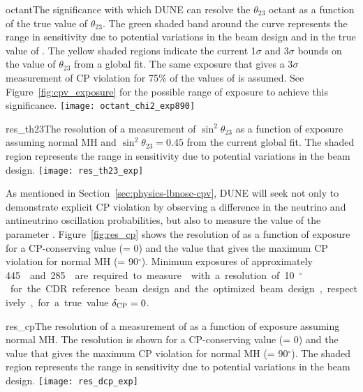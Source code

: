 \begin{cdrfigure}{octant}{The significance with which DUNE can resolve the $\theta_{23}$ octant as a function of the true value of $\theta_{23}$. The green shaded band around the curve represents the range in sensitivity due to potential variations in the beam design and in the true value of \deltacp. The yellow shaded regions indicate the current 1$\sigma$ and 3$\sigma$ bounds on the value of $\theta_{23}$ from a global fit.  The same exposure that gives a 3$\sigma$ measurement of CP violation for 75\% of the values of \deltacp is assumed.  See Figure~\ref{fig:cpv_exposure} for the possible range of exposure to achieve this significance.}
 \texttt{[image: octant\_chi2\_exp890]}
\end{cdrfigure}

\begin{cdrfigure}{res_th23}{The resolution of a measurement of $\sin^2\theta_{23}$ as a function of exposure assuming normal MH and $\sin^2\theta_{23} = 0.45$ from the current global fit. The shaded region represents the range in sensitivity due to potential variations in the beam design.  }
 \texttt{[image: res\_th23\_exp]}
\end{cdrfigure}


As mentioned in Section~\ref{sec:physics-lbnosc-cpv}, DUNE will seek not only to demonstrate explicit CP violation by observing a difference in the neutrino and antineutrino oscillation probabilities, but also to measure the value of the parameter \deltacp.  Figure~\ref{fig:res_cp} shows the resolution of \deltacp as a function of exposure for a CP-conserving value (\deltacp = 0) and the value that gives the maximum CP violation for normal MH (\deltacp = 90\mbox{$^{\circ}$}).  Minimum exposures of approximately \SI{445}~\ktMWyr{} and \SI{285}~\ktMWyr{} are required to measure \deltacp with a resolution of 10\mbox{$^{\circ}$}  for the CDR reference beam design and the optimized beam design, respectively, for a true value $\mdeltacp = 0$.

\begin{cdrfigure}{res_cp}{The resolution of a measurement of \deltacp as a function of exposure assuming normal MH.  The resolution is shown for a CP-conserving value (\deltacp = 0) and the value that gives the maximum CP violation for normal MH (\deltacp = 90\mbox{$^{\circ}$}). The shaded region represents the range in sensitivity due to potential variations in the beam design.  }
 \texttt{[image: res\_dcp\_exp]}
\end{cdrfigure}

